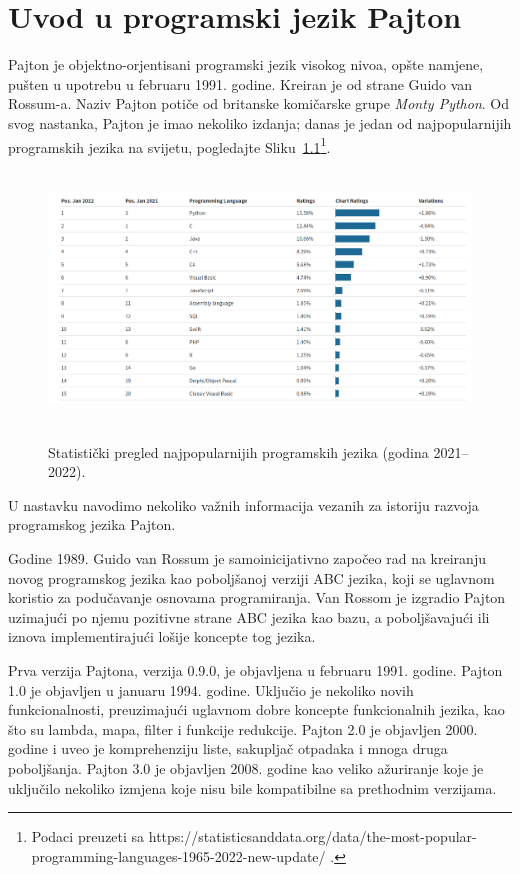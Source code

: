 \chapter{Uvod u programski jezik Pajton} 
 

Pajton je objektno-orjentisani programski jezik visokog nivoa,  opšte   namjene,   pušten u upotrebu u februaru 1991. godine. Kreiran je od strane Guido van Rossum-a. Naziv Pajton potiče od britanske komičarske grupe \textit{Monty Python}. Od svog nastanka, Pajton je imao nekoliko  izdanja; danas je jedan od najpopularnijih programskih jezika na svijetu, pogledajte Sliku~\ref{fig: popular_program_lang}\footnote{Podaci preuzeti sa  https://statisticsanddata.org/data/the-most-popular-programming-languages-1965-2022-new-update/ .}.

\begin{figure}[H]
	\centering
	\includegraphics[width=380pt,height=190pt]{slike/most_popular_language.png}
	\label{fig: popular_program_lang}
	\caption{Statistički pregled najpopularnijih programskih jezika (godina 2021--2022). }
\end{figure}

U nastavku navodimo nekoliko važnih informacija vezanih za istoriju razvoja programskog jezika Pajton. 
 
Godine 1989. Guido van Rossum je samoinicijativno započeo rad na kreiranju novog programskog jezika kao poboljšanoj verziji ABC jezika, koji se uglavnom koristio za podučavanje osnovama  programiranja. Van Rossom je izgradio Pajton uzimajući po njemu pozitivne strane ABC jezika kao bazu, a poboljšavajući ili iznova implementirajući lošije koncepte tog jezika. 

 Prva verzija Pajtona, verzija 0.9.0, je objavljena  u februaru 1991. godine.
Pajton 1.0 je objavljen u januaru 1994. godine.  Uključio je nekoliko novih funkcionalnosti, preuzimajući uglavnom dobre koncepte funkcionalnih jezika, kao što su lambda, mapa, filter i funkcije redukcije.
Pajton 2.0 je objavljen 2000. godine i uveo je komprehenziju liste, sakupljač otpadaka i mnoga druga poboljšanja.
Pajton 3.0 je objavljen 2008. godine kao veliko ažuriranje koje je uključilo nekoliko izmjena koje nisu bile kompatibilne sa prethodnim verzijama. \\ 

